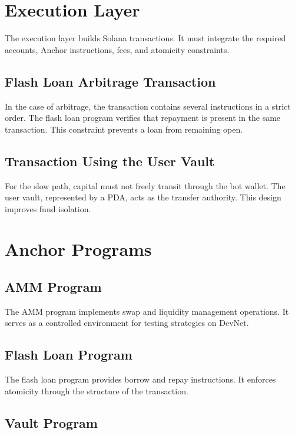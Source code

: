 \documentclass[12pt,a4paper]{report}
\begin{document}
\section{Execution Layer}

The execution layer builds Solana transactions. It must integrate the required accounts, Anchor instructions, fees, and atomicity constraints.

\subsection{Flash Loan Arbitrage Transaction}

In the case of arbitrage, the transaction contains several instructions in a strict order. The flash loan program verifies that repayment is present in the same transaction. This constraint prevents a loan from remaining open.

\subsection{Transaction Using the User Vault}

For the slow path, capital must not freely transit through the bot wallet. The user vault, represented by a PDA, acts as the transfer authority. This design improves fund isolation.

\section{Anchor Programs}

\subsection{AMM Program}

The AMM program implements swap and liquidity management operations. It serves as a controlled environment for testing strategies on DevNet.

\subsection{Flash Loan Program}

The flash loan program provides borrow and repay instructions. It enforces atomicity through the structure of the transaction.

\subsection{Vault Program}
\end{document}
